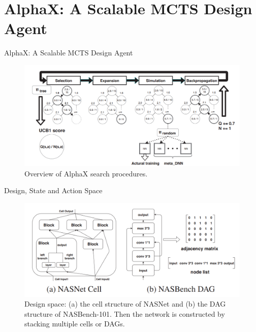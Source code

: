 \documentclass{beamer}
\begin{document}
\section{AlphaX: A Scalable MCTS Design Agent}
\begin{frame}{AlphaX: A Scalable MCTS Design Agent}
\begin{figure}
        \centering
        \includegraphics[scale=0.5]{images/nas2.png}
        \caption{Overview of AlphaX search procedures.}
        \label{fig:enter-label}
    \end{figure}
\end{frame}
\begin{frame}{Design, State and Action Space}
\begin{figure}
        \centering
        \includegraphics[scale=0.5]{images/nas3.png}
        \caption{Design space: (a) the cell structure of NASNet and
(b) the DAG structure of NASBench-101. Then the network
is constructed by stacking multiple cells or DAGs.}
        \label{fig:enter-label}
    \end{figure}
\end{frame}
\end{document}
